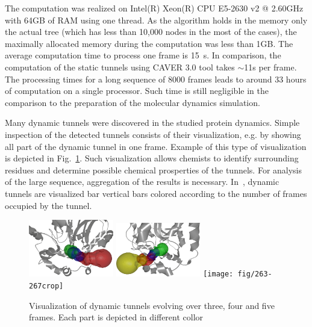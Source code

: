 \documentclass[usletter, 10pt, conference]{svjour3}      %
\begin{document}
The computation was realized on Intel(R) Xeon(R) CPU E5-2630 v2 @ 2.60GHz with 64GB of RAM using one thread.
As the algorithm holds in the memory only the actual tree (which has less than 10,000 nodes in the most of the cases),
the maximally allocated memory during the computation was less than 1GB.
The average computation time to process one frame is 15~s.
In comparison, the computation of the static tunnels using CAVER 3.0 tool takes $\sim$11s per frame.
The processing times for a long sequence of 8000 frames leads to around 33 hours of computation on a single processor.
Such time is still negligible in the comparison to the preparation of the molecular dynamics simulation.

Many dynamic tunnels were discovered in the studied protein dynamics.
Simple inspection of the detected tunnels consists of their visualization, e.g. by showing all part of the dynamic
tunnel in one frame.
Example of this type of visualization is depicted in Fig.~\ref{fig::joint}.
Such visualization allows chemists to identify surrounding residues and determine possible chemical prosperties
of the tunnels.
For analysis of the large sequence, aggregation of the results is necessary.
In~\cite{fig::vis1}, dynamic tunnels are visualized bar vertical bars colored according to the number of frames occupied by the tunnel.


   
    
\begin{figure}
\centering
\includegraphics[width=0.33\textwidth]{fig/58-60crop}
\includegraphics[width=0.33\textwidth]{fig/280-283crop}
\texttt{[image: fig/263-267crop]}
\caption{\label{fig::joint}
Visualization of dynamic tunnels evolving over three, four and five frames.
Each part is depicted in different collor
}
\end{figure}
\end{document}
